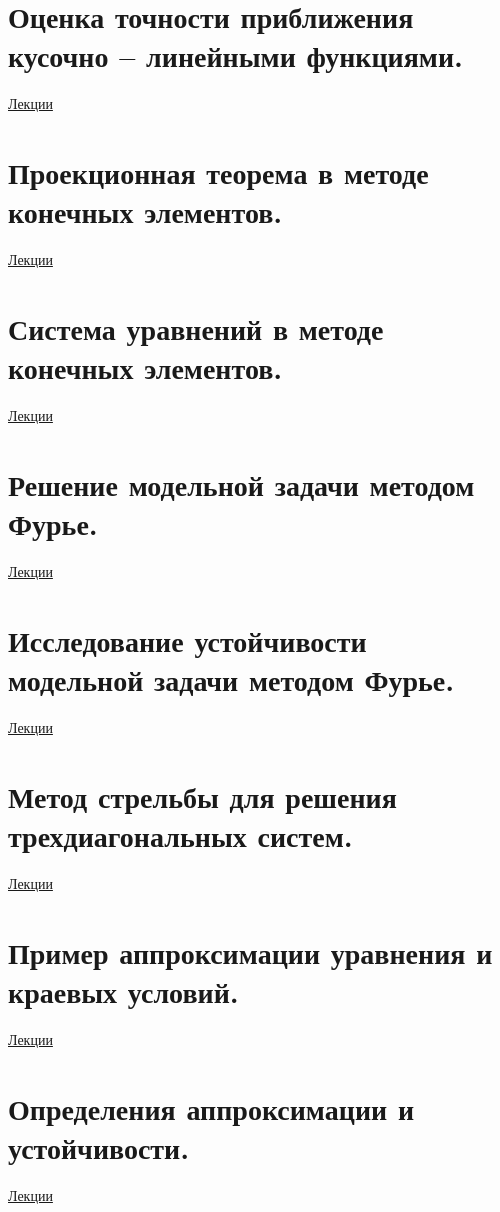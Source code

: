 \documentclass[specialist, subf, href, colorlinks=true, 12pt, times, mtpro, final]{disser}
\theoremstyle{definition}
\begin{document}
\section {Оценка точности приближения кусочно -- линейными функциями.}
	\hyperlink {lects.102}{Лекции}\\

\section {Проекционная теорема в методе конечных элементов.}
	\hyperlink {lects.103}{Лекции}\\

\section {Система уравнений в методе конечных элементов.}
	\hyperlink {lects.106}{Лекции}\\

\section {Решение модельной задачи методом Фурье.}
	\hyperlink {lects.108}{Лекции}\\

\section {Исследование устойчивости модельной задачи методом Фурье.}
	\hyperlink {lects.111}{Лекции}\\

\section {Метод стрельбы для решения трехдиагональных систем.}
	\hyperlink {lects.112}{Лекции}\\

\section {Пример аппроксимации уравнения и краевых условий.}
	\hyperlink {lects.115}{Лекции}\\

\section {Определения аппроксимации и устойчивости.}
	\hyperlink {lects.118}{Лекции}\\
\end{document}
